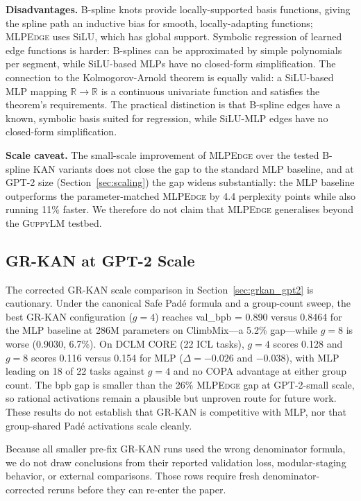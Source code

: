 \documentclass{article}
\newcommand{\mlpedge}{\textsc{MLPEdge}}
\newcommand{\guppylm}{\textsc{GuppyLM}}
\newcommand{\grkan}{\textsc{GR-KAN}}
\begin{document}
\textbf{Disadvantages.}
B-spline knots provide locally-supported basis functions, giving the spline
path an inductive bias for smooth, locally-adapting functions;
\mlpedge{} uses SiLU, which has global support.
Symbolic regression of learned edge functions is harder: B-splines can be
approximated by simple polynomials per segment, while SiLU-based MLPs have
no closed-form simplification.
The connection to the Kolmogorov-Arnold theorem is equally valid: a SiLU-based
MLP mapping $\mathbb{R}\to\mathbb{R}$ is a continuous univariate function and
satisfies the theorem's requirements.
The practical distinction is that B-spline edges have a known, symbolic basis
suited for regression, while SiLU-MLP edges have no closed-form simplification.

\textbf{Scale caveat.}
The small-scale improvement of \mlpedge{} over the tested B-spline KAN
variants does not close the gap to the standard MLP baseline, and at GPT-2
size (Section~\ref{sec:scaling}) the gap widens substantially: the MLP
baseline outperforms the parameter-matched \mlpedge{} by 4.4 perplexity
points while also running 11\% faster.
We therefore do not claim that \mlpedge{} generalises beyond the
\guppylm{} testbed.

\subsection{GR-KAN at GPT-2 Scale}

The corrected \grkan{} scale comparison in Section~\ref{sec:grkan_gpt2} is
cautionary.
Under the canonical Safe Pad\'{e} formula and a group-count sweep, the best
\grkan{} configuration ($g=4$) reaches val\_bpb = 0.890 versus 0.8464 for the
MLP baseline at 286M parameters on ClimbMix---a 5.2\% gap---while $g=8$ is worse
(0.9030, 6.7\%).
On DCLM CORE (22 ICL tasks), $g=4$ scores 0.128 and $g=8$ scores 0.116 versus
0.154 for MLP ($\Delta=-0.026$ and $-0.038$), with MLP leading on 18 of 22 tasks
against $g=4$ and no COPA advantage at either group count.
The bpb gap is smaller than the 26\% \mlpedge{} gap at GPT-2-small scale, so
rational activations remain a plausible but unproven route for future work.
These results do not establish that \grkan{} is competitive with MLP, nor that
group-shared Pad\'{e} activations scale cleanly.

Because all smaller pre-fix \grkan{} runs used the wrong denominator formula,
we do not draw conclusions from their reported validation loss, modular-staging
behavior, or external comparisons.
Those rows require fresh denominator-corrected reruns before they can re-enter
the paper.
\end{document}

